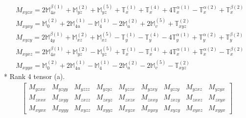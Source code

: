 \documentclass[fleqn,8pt,landscape]{jsarticle}
\begin{document}
\begin{align*}
& M_{xyzx} = 2 \mathbb{M}_{4x}^{\beta(1)} + \mathbb{M}_{yz}^{(2)} + \mathbb{M}_{yz}^{(5)} + \mathbb{T}_{x}^{(1)} + \mathbb{T}_{x}^{(4)} + 4 \mathbb{T}_{x}^{\alpha(1)} - \mathbb{T}_{x}^{\alpha(2)} + \mathbb{T}_{x}^{\beta(2)} \\
& M_{xyxy} = \mathbb{M}_{0}^{(2)} + 2 \mathbb{M}_{4u}^{(1)} - \mathbb{M}_{4}^{(1)} - 2 \mathbb{M}_{u}^{(2)} + 2 \mathbb{M}_{v}^{(5)} + \mathbb{T}_{xyz}^{(2)} \\
& M_{xyzy} = 2 \mathbb{M}_{4y}^{\beta(1)} + \mathbb{M}_{xz}^{(2)} + \mathbb{M}_{xz}^{(5)} - \mathbb{T}_{y}^{(1)} - \mathbb{T}_{y}^{(4)} - 4 \mathbb{T}_{y}^{\alpha(1)} + \mathbb{T}_{y}^{\alpha(2)} + \mathbb{T}_{y}^{\beta(2)} \\
& M_{xyxz} = 2 \mathbb{M}_{4x}^{\beta(1)} + \mathbb{M}_{yz}^{(2)} - \mathbb{M}_{yz}^{(5)} + \mathbb{T}_{x}^{(1)} - \mathbb{T}_{x}^{(4)} + 4 \mathbb{T}_{x}^{\alpha(1)} + \mathbb{T}_{x}^{\alpha(2)} - \mathbb{T}_{x}^{\beta(2)} \\
& M_{xyyx} = \mathbb{M}_{0}^{(2)} + 2 \mathbb{M}_{4u}^{(1)} - \mathbb{M}_{4}^{(1)} - 2 \mathbb{M}_{u}^{(2)} - 2 \mathbb{M}_{v}^{(5)} - \mathbb{T}_{xyz}^{(2)}
\end{align*}
* Rank 4 tensor (a).
\begin{align*}
\begin{bmatrix} M_{yzxx} & M_{yzyy} & M_{yzzz} & M_{yzyz} & M_{yzzx} & M_{yzxy} & M_{yzzy} & M_{yzxz} & M_{yzyx} \\ M_{zxxx} & M_{zxyy} & M_{zxzz} & M_{zxyz} & M_{zxzx} & M_{zxxy} & M_{zxzy} & M_{zxxz} & M_{zxyx} \\ M_{xyxx} & M_{xyyy} & M_{xyzz} & M_{xyyz} & M_{xyzx} & M_{xyxy} & M_{xyzy} & M_{xyxz} & M_{xyyx} \end{bmatrix}
\end{align*}
\end{document}
